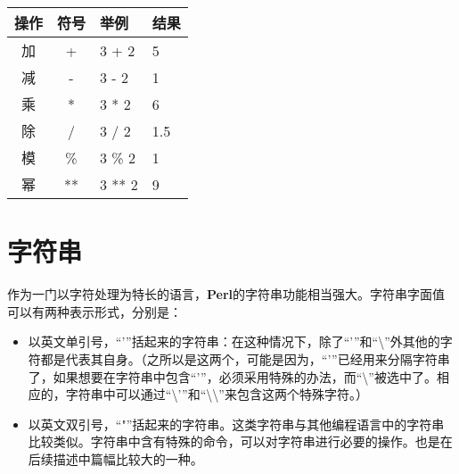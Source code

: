\documentclass[11pt]{book}
\newcommand{\programminglanguage}[1]{\textbf{#1}}
\begin{document}
			\begin{tabular}{|c|c|l|l|}
				\hline
				操作 & 符号 & 举例 & 结果\\
				\hline
				加 & + & 3 + 2 & 5 \\
				\hline
				减 & - & 3 - 2 & 1 \\
				\hline
				乘 & * & 3 * 2 & 6 \\
				\hline
				除 & / & 3 / 2 & 1.5 \\
				\hline
				模\footnotemark & \% & 3 \% 2 & 1 \\
				\hline
				幂 & ** & 3 ** 2 & 9 \\
				\hline
			\end{tabular}
		
		\section{字符串}
			作为一门以字符处理为特长的语言，\programminglanguage{Perl}的字符串功能相当强大。字符串字面值可以有两种表示形式，分别是：
			
			\begin{itemize}
				\item 以英文单引号，“'”括起来的字符串：在这种情况下，除了“'”和“\textbackslash”外其他的字符都是代表其自身。（之所以是这两个，可能是因为，“'”已经用来分隔字符串了，如果想要在字符串中包含“'”，必须采用特殊的办法，而“\textbackslash”被选中了。相应的，字符串中可以通过“\textbackslash'”和“\textbackslash\textbackslash”来包含这两个特殊字符。）
				\item 以英文双引号，“"”括起来的字符串。这类字符串与其他编程语言中的字符串比较类似。字符串中含有特殊的命令，可以对字符串进行必要的操作。也是在后续描述中篇幅比较大的一种。
			\end{itemize}
		
\end{document}
